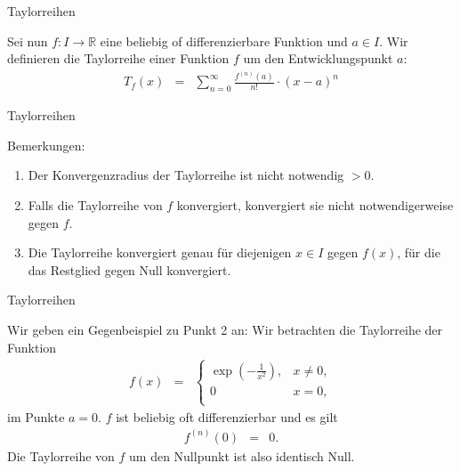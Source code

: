 \documentclass[german]{beamer}
\newcommand{\bq}{\begin{eqnarray*}}
\newcommand{\eq}{\end{eqnarray*}}
\begin{document}
\begin{frame}{Taylorreihen}

\begin{definition}[Taylorreihe]
Sei nun $f : I \rightarrow \mathbb R$ eine beliebig of differenzierbare Funktion und $a \in I$.
Wir definieren die Taylorreihe einer Funktion $f$ um den Entwicklungspunkt $a$:
\bq
 T_f(x) & = & \sum\limits_{n=0}^\infty \frac{f^{(n)}(a)}{n!} \cdot (x-a)^n
\eq
\end{definition}

\end{frame}

\begin{frame}{Taylorreihen}

Bemerkungen:
\begin{enumerate}
\item Der Konvergenzradius der Taylorreihe ist nicht notwendig $>0$.

\item Falls die Taylorreihe von $f$ konvergiert, konvergiert sie nicht notwendigerweise gegen $f$.

\item Die Taylorreihe konvergiert genau f\"ur diejenigen $x\in I$ gegen $f(x)$, f\"ur die das Restglied gegen
Null konvergiert.
\end{enumerate}

\end{frame}

\begin{frame}{Taylorreihen}

\begin{example}
Wir geben ein Gegenbeispiel zu Punkt 2 an: Wir betrachten die Taylorreihe der Funktion
\bq
 f(x) & = & \left\{ \begin{array}{ll}
                     \exp\left(-\frac{1}{x^2}\right), & x \neq 0, \\
                     0                                & x=0, \\
                    \end{array} \right.
\eq
im Punkte $a=0$. $f$ ist beliebig oft differenzierbar und es gilt
\bq
 f^{(n)}(0) & = & 0.
\eq
Die Taylorreihe von $f$ um den Nullpunkt ist also identisch Null.
\end{example}

\end{frame}
\end{document}

